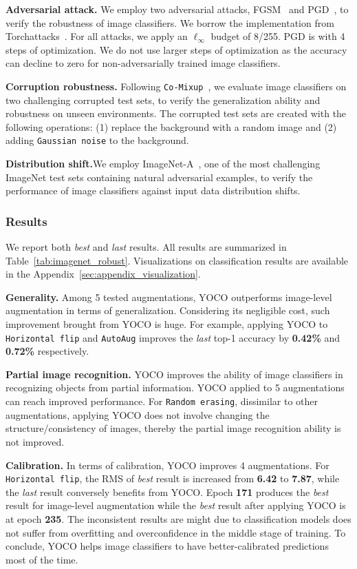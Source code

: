 \documentclass{article}
\begin{document}
\textbf{Adversarial attack.} We employ two adversarial attacks, FGSM~\cite{fgsm} and PGD~\cite{pgd}, to verify the robustness of image classifiers. We borrow the implementation from Torchattacks~\cite{kim2020torchattacks}. For all attacks, we apply an $\ell_{\infty}$ budget of 8/255. PGD is with 4 steps of optimization. We do not use larger steps of optimization as the accuracy can decline to zero for non-adversarially trained image classifiers. 

\textbf{Corruption robustness.} Following \texttt{Co-Mixup}~\cite{kim2021co}, we evaluate image classifiers on two challenging corrupted test sets, to verify the generalization ability and robustness on unseen environments. The corrupted test sets are created with the following operations: (1) replace the background 
with a random image and (2) adding \texttt{Gaussian noise} to the background.

\textbf{Distribution shift.}We employ ImageNet-A~\cite{hendrycks2021natural}, one of the most challenging ImageNet test sets containing natural adversarial examples, to verify the performance of image classifiers against input data distribution shifts. 

\subsubsection{Results} We report both \textit{best} and \textit{last} results. All results are summarized in Table~\ref{tab:imagenet_robust}. Visualizations on classification results are available in the Appendix~\ref{sec:appendix_visualization}.

\textbf{Generality.}
Among 5 tested augmentations, YOCO outperforms image-level augmentation in terms of generalization.  Considering its negligible cost, such improvement brought from YOCO is huge. For example, applying YOCO to \texttt{Horizontal flip} and \texttt{AutoAug} improves the \textit{last} top-1 accuracy by \textbf{0.42\%} and \textbf{0.72\%} respectively. 

\textbf{Partial image recognition.} 
YOCO improves the ability of image classifiers in recognizing objects from partial information. YOCO applied to 5 augmentations can reach improved performance. For \texttt{Random erasing}, dissimilar to other augmentations, applying YOCO does not involve changing the structure/consistency of images, thereby the partial image recognition ability is not improved. 

\textbf{Calibration.}
In terms of calibration, YOCO improves 4 augmentations. For \texttt{Horizontal flip}, the RMS of \textit{best} result is increased from\textbf{ 6.42} to \textbf{7.87}, while the \textit{last} result conversely benefits from YOCO. Epoch \textbf{171} produces the \textit{best} result for image-level augmentation while the \textit{best }result after applying YOCO is at epoch \textbf{235}. The inconsistent results are might due to classification models does not suffer from overfitting and overconfidence in the middle stage of training. 
To conclude, YOCO helps image classifiers to have better-calibrated predictions most of the time.
\end{document}
